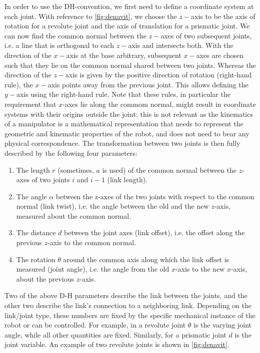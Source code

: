 In order to use the DH-convention, we first need to define a coordinate system at each joint. With reference to \cref{fig:denavit}, we choose the $z-$axis to be the axis of rotation for a revolute joint and the axis of translation for a prismatic joint.
We can now find the common normal between the $z-$axes of two subsequent joints, i.e. a line that is orthogonal to each $z-$axis and intersects both.
With the direction of the $x-$axis at the base arbitrary, subsequent $x-$axes are chosen such that they lie on the common normal shared between two joints.
Whereas the direction of the $z-$axis is given by the positive direction of rotation (right-hand rule), the $x-$axis points away from the previous joint.
This allows defining the $y-$axis using the right-hand rule.
Note that these rules, in particular the requirement that $x$-axes lie along the commom normal, might result in coordinate systems with their origins outside the joint: this is not relevant as the kinematics of a manipulator is a mathematical representation that needs to represent the geometric and kinematic properties of the robot, and does not need to bear any physical correspondence.
%
The transformation between two joints is then fully described by the following four parameters:
\begin{enumerate}
\item The length $r$ (sometimes, $a$ is used) of the common normal between the $z$-axes of two joints $i$ and $i-1$ (link length).
\item The angle $ \alpha$ between the z-axes of the two joints with respect to the common normal (link twist), i.e. the angle between the old and the new $z$-axis, measured about the common normal.
\item The distance $d$ between the joint axes (link offset), i.e. the offset along the previous $z$-axis to the common normal.
\item The rotation $ \theta$ around the common axis along which the link offset is measured (joint angle), i.e. the angle from the old $x$-axis to the new $x$-axis, about the previous $z$-axis.
\end{enumerate}

Two of the above D-H parameters describe the link between the joints, and the other two describe the link's connection to a neighboring link.
Depending on the link/joint type, these numbers are fixed by the specific mechanical instance of the robot or can be controlled.
For example, in a revolute joint $ \theta$ is the varying joint angle, while all other quantities are fixed.  Similarly, for a prismatic joint $d$ is the joint variable. An example of two revolute joints is shown in \cref{fig:denavit}.

